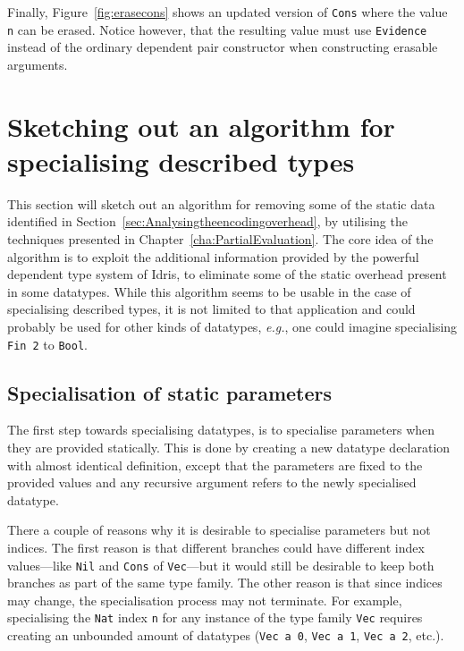 \documentclass{ituthesis}
\newcommand{\ttconstructor}[1]{\textcolor{constructor-color}{\texttt{#1}}}
\newcommand{\tttype}[1]{\textcolor{type-color}{\texttt{#1}}}
\newcommand{\ttdec}[1]{\textcolor{declared-var-color}{\texttt{#1}}}
\newcommand{\ttvar}[1]{\textcolor{local-var-color}{\texttt{#1}}}
\newcommand{\ttliteral}[1]{\textcolor{literal-color}{\texttt{#1}}}
\theoremstyle{break}
\begin{document}
Finally, Figure~\ref{fig:erasecons} shows an updated version of \ttdec{Cons} where the value \ttvar{n} can be erased.
Notice however, that the resulting value must use \ttconstructor{Evidence} instead of the ordinary dependent pair constructor when constructing erasable arguments.

\section{Sketching out an algorithm for specialising described types}
\label{sec:Sketchingoutanalgorithmforspecialisingdescribedtypes}
This section will sketch out an algorithm for removing some of the static data identified in Section~\ref{sec:Analysingtheencodingoverhead},
by utilising the techniques presented in Chapter~\ref{cha:PartialEvaluation}.
The core idea of the algorithm is to exploit the additional information provided by the powerful dependent type system of Idris,
to eliminate some of the static overhead present in some datatypes.
While this algorithm seems to be usable in the case of specialising described types, it is not limited to that application and could probably be used for other kinds of datatypes, \textit{e.g.},
one could imagine specialising \tttype{Fin}~\ttliteral{2} to \tttype{Bool}.

\subsection{Specialisation of static parameters}
\label{sub:Specialisationofstaticparameters}
The first step towards specialising datatypes, is to specialise parameters when they are provided statically.
This is done by creating a new datatype declaration with almost identical definition, except that the parameters are fixed to the provided values
and any recursive argument refers to the newly specialised datatype.

There a couple of reasons why it is desirable to specialise parameters but not indices.
The first reason is that different branches could have different index values---like \ttconstructor{Nil} and \ttconstructor{Cons} of \tttype{Vec}---but it would still be desirable to keep both branches as part of the same type family.
The other reason is that since indices may change, the specialisation process may not terminate.
For example, specialising the \tttype{Nat} index \ttvar{n} for any instance of the type family \tttype{Vec} requires creating an unbounded amount of datatypes (\tttype{Vec}~\ttvar{a}~\ttliteral{0}, \tttype{Vec}~\ttvar{a}~\ttliteral{1}, \tttype{Vec}~\ttvar{a}~\ttliteral{2}, etc.).
\end{document}
